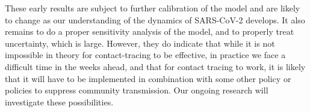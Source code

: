 \documentclass{article}
\begin{document}
These early results are subject to further calibration of the model and are likely to change as our understanding of the dynamics of SARS-CoV-2 develops. It also remains to do a proper sensitivity analysis of the model, and to properly treat uncertainty, which is large. However, they do indicate that while it is not impossible in theory for contact-tracing to be effective, in practice we face a difficult time in the weeks ahead, and that for contact tracing to work, it is likely that it will have to be implemented in combination with some other policy or policies to suppress community transmission. Our ongoing research will investigate these possibilities.

\pagebreak
%
% 


\end{document}
